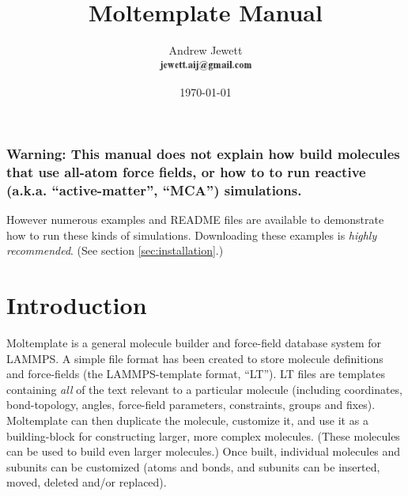 \documentclass[11pt]{article}
\begin{document}
\author{
  Andrew Jewett \\
  \includegraphics[height=0.3cm]{author_email.png}
}
\date \today


\title{Moltemplate Manual}



\maketitle


\tableofcontents


\subsubsection*{Warning:
  This manual does not explain how build molecules that use
  all-atom force fields, or how to to run reactive
  (a.k.a. ``active-matter'', ``MCA'') simulations.}
  
However numerous examples and README files are available to
demonstrate how to run these kinds of simulations.
Downloading these examples is \textit{highly recommended}.
(See section \ref{sec:installation}.)

\section{Introduction}



Moltemplate is a general molecule builder and force-field database system for LAMMPS.  A simple file format has been created to store molecule definitions and force-fields (the LAMMPS-template format, “LT”). 
LT files are templates containing \textit{all} of the text relevant to a particular molecule (including coordinates, bond-topology, angles, force-field parameters, constraints, groups and fixes).  Moltemplate can then duplicate the molecule, customize it, and use it as a building-block for constructing larger, more complex molecules.  (These molecules can be used to build even larger molecules.)  Once built, individual molecules and subunits can be customized (atoms and bonds, and subunits can be inserted, moved, deleted and/or replaced).
\end{document}
